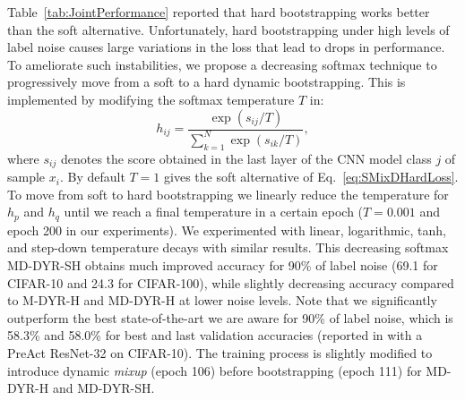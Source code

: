 \documentclass{article}
\begin{document}
Table~\ref{tab:JointPerformance} reported that hard bootstrapping
works better than the soft alternative. Unfortunately, hard
bootstrapping under high levels of label noise causes large variations
in the loss that lead to drops in performance. To ameliorate such instabilities,
we propose a decreasing softmax technique \cite{2005_ECML_DecreasingSoftMax}
to progressively move from a soft to a hard dynamic bootstrapping.
This is implemented by modifying the softmax temperature $T$
in: 
\begin{equation}
h_{ij}=\frac{\exp\!\left(s_{ij}/T\right)}{\sum_{k=1}^{N}\exp\!\left(s_{ik}/T\right)},
\end{equation}
where $s_{ij}$ denotes the score obtained
in the last layer of the CNN model class $j$ of sample $x_{i}$. By default
$T=1$ gives the soft alternative of Eq.~\eqref{eq:SMixDHardLoss}.
To move from soft to hard bootstrapping we linearly
reduce the temperature for $h_{p}$
and $h_{q}$ until we reach a final temperature in a certain
epoch ($T=0.001$ and epoch 200 in our experiments). We experimented
with linear, logarithmic, tanh, and step-down temperature decays with
similar results. This decreasing softmax MD-DYR-SH obtains
much improved accuracy for 90\% of label noise (69.1 for CIFAR-10 and
24.3 for CIFAR-100), while slightly decreasing accuracy compared
to M-DYR-H and MD-DYR-H at lower noise levels. Note that we significantly
outperform the best state-of-the-art we are aware for 90\% of label
noise, which is 58.3\% and 58.0\% for best and last validation accuracies (reported in \cite{2018_CVPR_JointOpt} with a PreAct ResNet-32 on CIFAR-10). The training process is slightly modified to introduce dynamic \emph{mixup} (epoch 106) before  bootstrapping (epoch 111) for MD-DYR-H and MD-DYR-SH.
\end{document}
